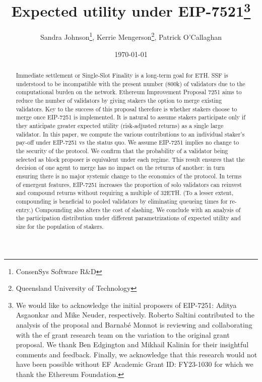 \documentclass{article}
\title{Expected utility under EIP-7521\footnote{We would like to acknowledge
    the initial proposers of EIP-7251: Aditya Asgaonkar and Mike Neuder,
    respectively. Roberto Saltini contributed to the analysis of the proposal
    and Barnab\'e Monnot is reviewing and collaborating with the \gls{ef} grant
    research team on the variation to the original grant proposal. We thank Ben
    Edgington and Mikhail Kalinin for their insightful comments and feedback.
    Finally, we acknowledge that this research would not have been possible
    without EF Academic Grant ID: FY23-1030 for which we thank the Ethereum
Foundation.}
}
\author{Sandra Johnson\footnote{ConsenSys Software R\&D}, Kerrie
  Mengerson\footnote{Queensland University of Technology}, Patrick
O'Callaghan\\ }
\date{\today}                                           %
\begin{document}
\maketitle
\begin{abstract}
  Immediate settlement or Single-Slot Finality is a long-term goal for ETH. SSF
  is understood to be incompatible with the present number (800k) of validators
  due to the computational burden on the network. Ethereum Improvement Proposal
  7251 aims to reduce the number of validators by giving stakers the option to 
  merge existing validators. Key to the success of this proposal therefore is
  whether stakers choose to merge once EIP-7251 is implemented. It is natural
  to assume stakers participate only if they anticipate greater expected
  utility (risk-adjusted returns) as a single large validator. In this paper,
  we compute the various contributions to an individual staker's pay-off under
  EIP-7251 vs the status quo. We assume EIP-7251 implies no change to the
  security of the protocol. We confirm that the probability of a validator
  being selected as block proposer is equivalent under each regime. This result
  ensures that the decision of one agent to merge has no impact on the returns
  of another: in turn ensuring there is no major systemic change to the
  economics of the protocol. In terms of emergent features, EIP-7251 increases
  the proportion of solo validators can reinvest and compound returns without
  requiring a multiple of 32ETH. (To a lesser extent, compounding is beneficial
  to pooled validators by eliminating queueing times for re-entry.) Compounding
  also alters the cost of slashing. We conclude with an analysis of the
  participation distribution under different parametrizations of expected
  utility and size for the population of stakers.

\end{abstract}


\end{document}

